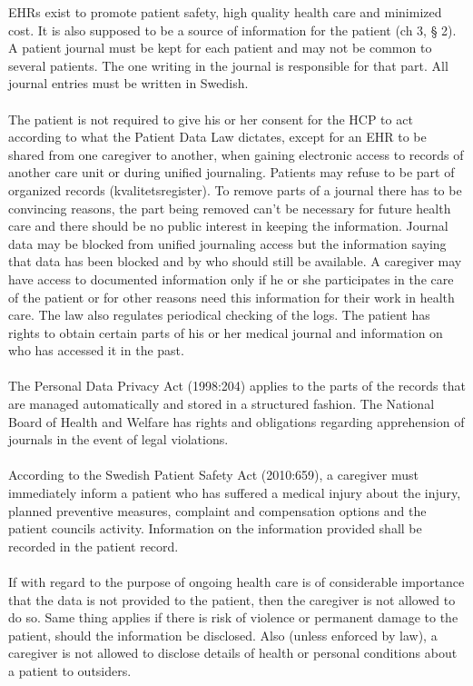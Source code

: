 \documentclass[14pt]{article}
\begin{document}
\glspl{EHR} exist to promote patient safety, high quality health care and minimized cost. It is also supposed to be a source of information for the patient (ch 3, § 2). A patient journal must be kept for each patient and may not be common to several patients. The one writing in the journal is responsible for that part. All journal entries must be written in Swedish. \cite{PatientDataAct}
\\\\
The patient is not required to give his or her consent for the \gls{HCP} to act according to what the Patient Data Law dictates, except for an EHR to be shared from one caregiver to another, when gaining electronic access to records of another care unit or during unified journaling. Patients may refuse to be part of organized records (kvalitetsregister). To remove parts of a journal there has to be convincing reasons, the part being removed can't be necessary for future health care and there should be no public interest in keeping the information. Journal data may be blocked from unified journaling access but the information saying that data has been blocked and by who should still be available. A caregiver may have access to documented information only if he or she participates in the care of the patient or for other reasons need this information for their work in health care. The law also regulates periodical checking of the logs. The patient has rights to obtain certain parts of his or her medical journal and information on who has accessed it in the past.\cite{PatientDataAct}
\\\\
The Personal Data Privacy Act (1998:204) applies to the parts of the records that are managed automatically and stored in a structured fashion. The National Board of Health and Welfare has rights and obligations regarding apprehension of journals in the event of legal violations.\cite{PatientDataAct}
\\\\
According to the Swedish Patient Safety Act (2010:659), a caregiver must immediately inform a patient who has suffered a medical injury
about the injury, planned preventive measures, complaint and compensation
options and the patient councils activity. Information on the information provided shall be recorded in the patient record.\cite{PatientSafetyAct}
\\\\
If with regard to the purpose of ongoing health care is of considerable importance
that the data is not provided to the patient, then the caregiver is not allowed to
do so. Same thing applies if there is risk of violence or permanent damage to the
patient, should the information be disclosed. Also (unless enforced by law), a caregiver is not allowed to disclose details of health or personal conditions about a patient to outsiders.\cite{PatientSafetyAct}
\end{document}
